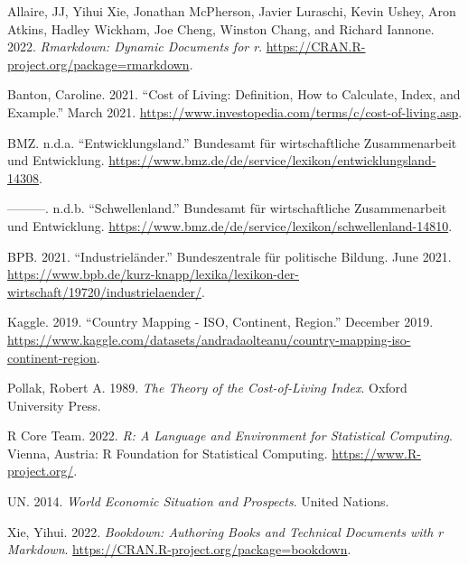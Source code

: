 \documentclass[
  11pt,
  a4paper,
  twoside]{scrbook}
\newlength{\cslhangindent}
\newlength{\cslentryspacingunit} %
\newenvironment{CSLReferences}[2] %
 {%
  \setlength{\parindent}{0pt}
  \ifodd #1
  \let\oldpar\par
  \def\par{\hangindent=\cslhangindent\oldpar}
  \fi
    \setlength{\parskip}{#2\cslentryspacingunit+5pt}
   }%
 {}
\begin{document}
\hypertarget{refs}{}
\begin{CSLReferences}{1}{0}
\leavevmode{}%
Allaire, JJ, Yihui Xie, Jonathan McPherson, Javier Luraschi, Kevin Ushey, Aron Atkins, Hadley Wickham, Joe Cheng, Winston Chang, and Richard Iannone. 2022. \emph{Rmarkdown: Dynamic Documents for r}. \url{https://CRAN.R-project.org/package=rmarkdown}.

\leavevmode{}%
Banton, Caroline. 2021. {``Cost of Living: Definition, How to Calculate, Index, and Example.''} March 2021. \url{https://www.investopedia.com/terms/c/cost-of-living.asp}.

\leavevmode{}%
BMZ. n.d.a. {``Entwicklungsland.''} Bundesamt für wirtschaftliche Zusammenarbeit und Entwicklung. \url{https://www.bmz.de/de/service/lexikon/entwicklungsland-14308}.

\leavevmode{}%
---------. n.d.b. {``Schwellenland.''} Bundesamt für wirtschaftliche Zusammenarbeit und Entwicklung. \url{https://www.bmz.de/de/service/lexikon/schwellenland-14810}.

\leavevmode{}%
BPB. 2021. {``Industrieländer.''} Bundeszentrale für politische Bildung. June 2021. \url{https://www.bpb.de/kurz-knapp/lexika/lexikon-der-wirtschaft/19720/industrielaender/}.

\leavevmode{}%
Kaggle. 2019. {``Country Mapping - ISO, Continent, Region.''} December 2019. \url{https://www.kaggle.com/datasets/andradaolteanu/country-mapping-iso-continent-region}.

\leavevmode{}%
Pollak, Robert A. 1989. \emph{The Theory of the Cost-of-Living Index}. Oxford University Press.

\leavevmode{}%
R Core Team. 2022. \emph{R: A Language and Environment for Statistical Computing}. Vienna, Austria: R Foundation for Statistical Computing. \url{https://www.R-project.org/}.

\leavevmode{}%
UN. 2014. \emph{World Economic Situation and Prospects}. United Nations.

\leavevmode{}%
Xie, Yihui. 2022. \emph{Bookdown: Authoring Books and Technical Documents with r Markdown}. \url{https://CRAN.R-project.org/package=bookdown}.

\end{CSLReferences}
\end{document}
